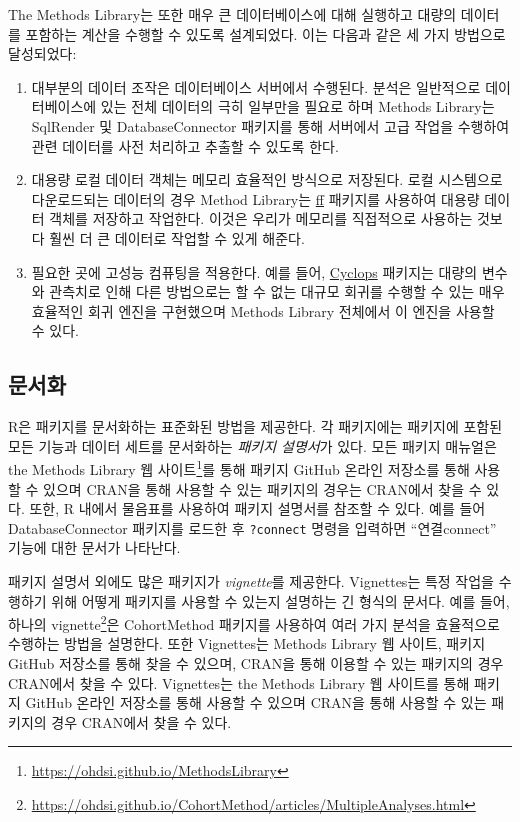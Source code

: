 \documentclass[10.5pt]{book}
\providecommand{\tightlist}{%
  \setlength{\itemsep}{0pt}\setlength{\parskip}{0pt}}
\let\rmarkdownfootnote\footnote%
\def\footnote{\protect\rmarkdownfootnote}
\theoremstyle{definition}
\theoremstyle{definition}
\theoremstyle{definition}
\theoremstyle{remark}
\begin{document}
The Methods Library는 또한 매우 큰 데이터베이스에 대해 실행하고 대량의
데이터를 포함하는 계산을 수행할 수 있도록 설계되었다. 이는 다음과 같은
세 가지 방법으로 달성되었다:

\begin{enumerate}
\def\labelenumi{\arabic{enumi}.}
\tightlist
\item
  대부분의 데이터 조작은 데이터베이스 서버에서 수행된다. 분석은
  일반적으로 데이터베이스에 있는 전체 데이터의 극히 일부만을 필요로 하며
  Methods Library는 SqlRender 및 DatabaseConnector 패키지를 통해
  서버에서 고급 작업을 수행하여 관련 데이터를 사전 처리하고 추출할 수
  있도록 한다.
\item
  대용량 로컬 데이터 객체는 메모리 효율적인 방식으로 저장된다. 로컬
  시스템으로 다운로드되는 데이터의 경우 Method Library는
  \href{https://cran.r-project.org/web/packages/ff}{ff} 패키지를
  사용하여 대용량 데이터 객체를 저장하고 작업한다. 이것은 우리가
  메모리를 직접적으로 사용하는 것보다 훨씬 더 큰 데이터로 작업할 수 있게
  해준다.
\item
  필요한 곳에 고성능 컴퓨팅을 적용한다. 예를 들어,
  \href{https://ohdsi.github.io/Cyclops/}{Cyclops} 패키지는 대량의
  변수와 관측치로 인해 다른 방법으로는 할 수 없는 대규모 회귀를 수행할
  수 있는 매우 효율적인 회귀 엔진을 구현했으며 Methods Library 전체에서
  이 엔진을 사용할 수 있다.
\end{enumerate}

\subsection{문서화}

R은 패키지를 문서화하는 표준화된 방법을 제공한다. 각 패키지에는 패키지에
포함된 모든 기능과 데이터 세트를 문서화하는 \emph{패키지 설명서}가 있다.
모든 패키지 매뉴얼은 the Methods Library 웹 사이트\footnote{\url{https://ohdsi.github.io/MethodsLibrary}}를
통해 패키지 GitHub 온라인 저장소를 통해 사용할 수 있으며 CRAN을 통해
사용할 수 있는 패키지의 경우는 CRAN에서 찾을 수 있다. 또한, R 내에서
물음표를 사용하여 패키지 설명서를 참조할 수 있다. 예를 들어
DatabaseConnector 패키지를 로드한 후 \texttt{?connect} 명령을 입력하면
``연결connect'' 기능에 대한 문서가 나타난다.

패키지 설명서 외에도 많은 패키지가 \emph{vignette}를 제공한다.
Vignettes는 특정 작업을 수행하기 위해 어떻게 패키지를 사용할 수 있는지
설명하는 긴 형식의 문서다. 예를 들어, 하나의 vignette\footnote{\url{https://ohdsi.github.io/CohortMethod/articles/MultipleAnalyses.html}}은
CohortMethod 패키지를 사용하여 여러 가지 분석을 효율적으로 수행하는
방법을 설명한다. 또한 Vignettes는 Methods Library 웹 사이트, 패키지
GitHub 저장소를 통해 찾을 수 있으며, CRAN을 통해 이용할 수 있는 패키지의
경우 CRAN에서 찾을 수 있다. Vignettes는 the Methods Library 웹 사이트를
통해 패키지 GitHub 온라인 저장소를 통해 사용할 수 있으며 CRAN을 통해
사용할 수 있는 패키지의 경우 CRAN에서 찾을 수 있다. 
\end{document}
